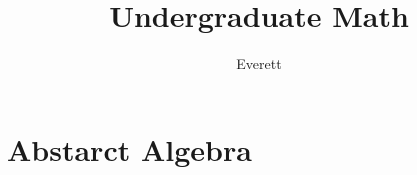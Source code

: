 \documentclass[11pt, a4paper]{scrbook}
\title{Undergraduate Math}
\author{Everett}
\begin{document}
\frontmatter
\maketitle
\newpage
\tableofcontents
\mainmatter
\part{Abstarct Algebra}
\parttoc


\backmatter
\end{document}
